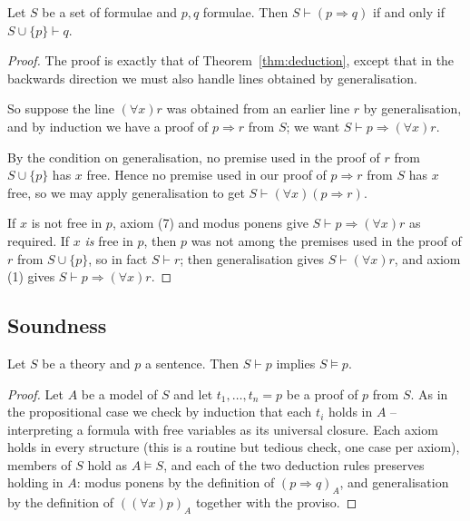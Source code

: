 \begin{proposition}\label{prop:preddeduction}
  Let $S$ be a set of formulae and $p, q$ formulae. Then $S \vdash (p \Rightarrow q)$ if and only if $S \cup \{p\} \vdash q$.
\end{proposition}
\begin{proof}
  The proof is exactly that of Theorem~\ref{thm:deduction}, except that in the backwards direction we must also handle lines obtained by generalisation.

  So suppose the line $(\forall x) r$ was obtained from an earlier line $r$ by generalisation, and by induction we have a proof of $p \Rightarrow r$ from $S$; we want $S \vdash p \Rightarrow (\forall x) r$.

  By the condition on generalisation, no premise used in the proof of $r$ from $S \cup \{p\}$ has $x$ free. Hence no premise used in our proof of $p \Rightarrow r$ from $S$ has $x$ free, so we may apply generalisation to get $S \vdash (\forall x)(p \Rightarrow r)$.

  If $x$ is not free in $p$, axiom (7) and modus ponens give $S \vdash p \Rightarrow (\forall x) r$ as required. If $x$ \emph{is} free in $p$, then $p$ was not among the premises used in the proof of $r$ from $S \cup \{p\}$, so in fact $S \vdash r$; then generalisation gives $S \vdash (\forall x) r$, and axiom (1) gives $S \vdash p \Rightarrow (\forall x) r$.
\end{proof}

\subsection{Soundness}

\begin{proposition}[Soundness]
  Let $S$ be a theory and $p$ a sentence. Then $S \vdash p$ implies $S \models p$.
\end{proposition}
\begin{proof}
  Let $A$ be a model of $S$ and let $t_1, \dots, t_n = p$ be a proof of $p$ from $S$. As in the propositional case we check by induction that each $t_i$ holds in $A$ -- interpreting a formula with free variables as its universal closure. Each axiom holds in every structure (this is a routine but tedious check, one case per axiom), members of $S$ hold as $A \models S$, and each of the two deduction rules preserves holding in $A$: modus ponens by the definition of $(p \Rightarrow q)_A$, and generalisation by the definition of $((\forall x)p)_A$ together with the proviso.
\end{proof}

